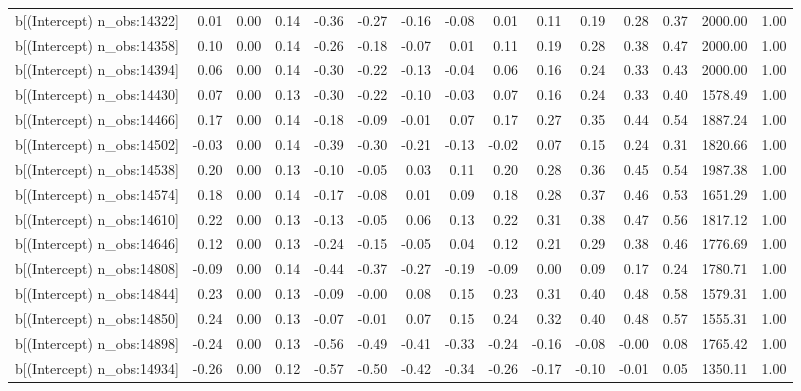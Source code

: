 \begin{table}[ht]
\begin{tabular}{rrrrrrrrrrrrrrr}
  b[(Intercept) n\_obs:14322] & 0.01 & 0.00 & 0.14 & -0.36 & -0.27 & -0.16 & -0.08 & 0.01 & 0.11 & 0.19 & 0.28 & 0.37 & 2000.00 & 1.00 \\ 
  b[(Intercept) n\_obs:14358] & 0.10 & 0.00 & 0.14 & -0.26 & -0.18 & -0.07 & 0.01 & 0.11 & 0.19 & 0.28 & 0.38 & 0.47 & 2000.00 & 1.00 \\ 
  b[(Intercept) n\_obs:14394] & 0.06 & 0.00 & 0.14 & -0.30 & -0.22 & -0.13 & -0.04 & 0.06 & 0.16 & 0.24 & 0.33 & 0.43 & 2000.00 & 1.00 \\ 
  b[(Intercept) n\_obs:14430] & 0.07 & 0.00 & 0.13 & -0.30 & -0.22 & -0.10 & -0.03 & 0.07 & 0.16 & 0.24 & 0.33 & 0.40 & 1578.49 & 1.00 \\ 
  b[(Intercept) n\_obs:14466] & 0.17 & 0.00 & 0.14 & -0.18 & -0.09 & -0.01 & 0.07 & 0.17 & 0.27 & 0.35 & 0.44 & 0.54 & 1887.24 & 1.00 \\ 
  b[(Intercept) n\_obs:14502] & -0.03 & 0.00 & 0.14 & -0.39 & -0.30 & -0.21 & -0.13 & -0.02 & 0.07 & 0.15 & 0.24 & 0.31 & 1820.66 & 1.00 \\ 
  b[(Intercept) n\_obs:14538] & 0.20 & 0.00 & 0.13 & -0.10 & -0.05 & 0.03 & 0.11 & 0.20 & 0.28 & 0.36 & 0.45 & 0.54 & 1987.38 & 1.00 \\ 
  b[(Intercept) n\_obs:14574] & 0.18 & 0.00 & 0.14 & -0.17 & -0.08 & 0.01 & 0.09 & 0.18 & 0.28 & 0.37 & 0.46 & 0.53 & 1651.29 & 1.00 \\ 
  b[(Intercept) n\_obs:14610] & 0.22 & 0.00 & 0.13 & -0.13 & -0.05 & 0.06 & 0.13 & 0.22 & 0.31 & 0.38 & 0.47 & 0.56 & 1817.12 & 1.00 \\ 
  b[(Intercept) n\_obs:14646] & 0.12 & 0.00 & 0.13 & -0.24 & -0.15 & -0.05 & 0.04 & 0.12 & 0.21 & 0.29 & 0.38 & 0.46 & 1776.69 & 1.00 \\ 
  b[(Intercept) n\_obs:14808] & -0.09 & 0.00 & 0.14 & -0.44 & -0.37 & -0.27 & -0.19 & -0.09 & 0.00 & 0.09 & 0.17 & 0.24 & 1780.71 & 1.00 \\ 
  b[(Intercept) n\_obs:14844] & 0.23 & 0.00 & 0.13 & -0.09 & -0.00 & 0.08 & 0.15 & 0.23 & 0.31 & 0.40 & 0.48 & 0.58 & 1579.31 & 1.00 \\ 
  b[(Intercept) n\_obs:14850] & 0.24 & 0.00 & 0.13 & -0.07 & -0.01 & 0.07 & 0.15 & 0.24 & 0.32 & 0.40 & 0.48 & 0.57 & 1555.31 & 1.00 \\ 
  b[(Intercept) n\_obs:14898] & -0.24 & 0.00 & 0.13 & -0.56 & -0.49 & -0.41 & -0.33 & -0.24 & -0.16 & -0.08 & -0.00 & 0.08 & 1765.42 & 1.00 \\ 
  b[(Intercept) n\_obs:14934] & -0.26 & 0.00 & 0.12 & -0.57 & -0.50 & -0.42 & -0.34 & -0.26 & -0.17 & -0.10 & -0.01 & 0.05 & 1350.11 & 1.00 \\ 

\end{tabular}
\end{table}
